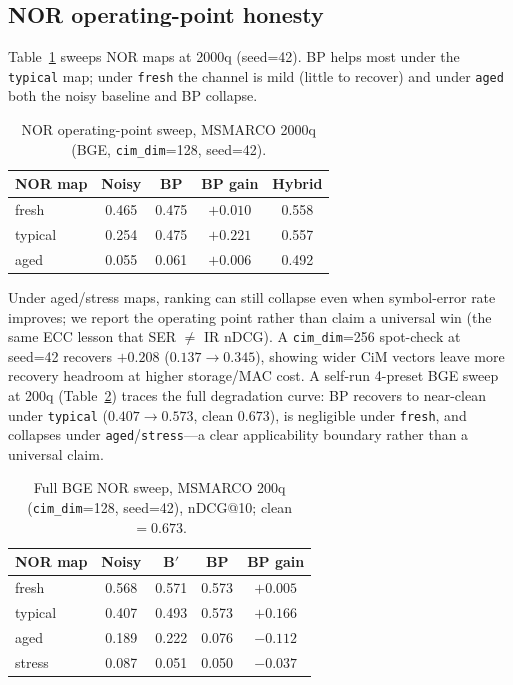 \documentclass[sigconf,review,anonymous]{acmart}
\begin{document}
\subsection{NOR operating-point honesty}
Table~\ref{tab:nor} sweeps NOR maps at 2000q (seed=42).
BP helps most under the \texttt{typical} map; under \texttt{fresh} the channel is mild (little to recover) and under \texttt{aged} both the noisy baseline and BP collapse.
\begin{table}[t]
\caption{NOR operating-point sweep, MSMARCO 2000q (BGE, \texttt{cim\_dim}=128, seed=42).}
\label{tab:nor}
\begin{tabular}{lcccc}
\toprule
NOR map & Noisy & BP & BP gain & Hybrid \\
\midrule
fresh & 0.465 & 0.475 & $+0.010$ & 0.558 \\
typical & 0.254 & 0.475 & $+0.221$ & 0.557 \\
aged & 0.055 & 0.061 & $+0.006$ & 0.492 \\
\bottomrule
\end{tabular}
\end{table}
Under aged/stress maps, ranking can still collapse even when symbol-error rate improves; we report the operating point rather than claim a universal win (the same ECC lesson that SER $\neq$ IR nDCG).
A \texttt{cim\_dim}=256 spot-check at seed=42 recovers $+0.208$ ($0.137\rightarrow0.345$), showing wider CiM vectors leave more recovery headroom at higher storage/MAC cost.
A self-run 4-preset BGE sweep at 200q (Table~\ref{tab:norfull}) traces the full degradation curve: BP recovers to near-clean under \texttt{typical} ($0.407\rightarrow0.573$, clean $0.673$), is negligible under \texttt{fresh}, and collapses under \texttt{aged}/\texttt{stress}---a clear applicability boundary rather than a universal claim.
\begin{table}[t]
\caption{Full BGE NOR sweep, MSMARCO 200q (\texttt{cim\_dim}=128, seed=42), nDCG@10; clean${=}0.673$.}
\label{tab:norfull}
\small
\setlength{\tabcolsep}{4pt}
\begin{tabular}{lcccc}
\toprule
NOR map & Noisy & B$'$ & BP & BP gain \\
\midrule
fresh & 0.568 & 0.571 & 0.573 & $+0.005$ \\
typical & 0.407 & 0.493 & 0.573 & $+0.166$ \\
aged & 0.189 & 0.222 & 0.076 & $-0.112$ \\
stress & 0.087 & 0.051 & 0.050 & $-0.037$ \\
\bottomrule
\end{tabular}
\end{table}
\end{document}
